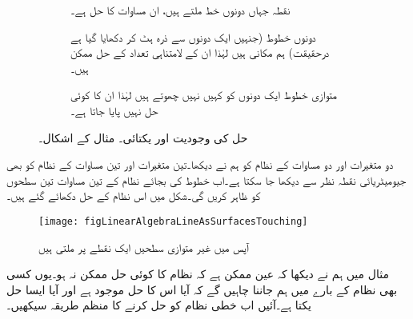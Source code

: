 \begin{figure}
\centering
\begin{subfigure}{0.30\textwidth}
\centering
{}
\caption{ نقطہ  جہاں دونوں خط ملتے ہیں، ان مساوات کا حل ہے۔}
\end{subfigure} \hfill
\begin{subfigure}{0.30\textwidth}
\centering
{}
\caption{ دونوں خطوط (جنہیں ایک دونوں سے ذرہ ہٹ کر دکھایا گیا ہے درحقیقت) ہم مکانی ہیں لہٰذا ان کے لامتناہی تعداد کے حل ممکن ہیں۔}
\end{subfigure}\hfill
\begin{subfigure}{0.30\textwidth}
\centering
{}
\caption{ متوازی خطوط ایک دونوں کو کہیں نہیں چھوتے ہیں لہٰذا ان کا کوئی حل نہیں پایا جاتا ہے۔}
\end{subfigure} \hfill
\caption{حل کی وجودیت اور یکتائی۔ مثال  کے اشکال۔}
\label{شکل_مثال_الجبرا_وجودیت_یکتائی_حل_الف}
\end{figure}
دو متغیرات اور دو مساوات کے نظام کو ہم نے دیکھا۔تین متغیرات اور تین مساوات کے نظام  کو بھی جیومیٹریائی نقطہ نظر سے دیکھا جا سکتا ہے۔اب خطوط کی بجائے نظام کے تین مساوات تین سطحوں کو ظاہر کریں گی۔شکل  میں اس نظام کے حل دکھائے گئے ہیں۔
\begin{figure}
\centering
\texttt{[image: figLinearAlgebraLineAsSurfacesTouching]}
\caption{آپس میں غیر متوازی سطحیں ایک نقطے پر ملتی ہیں}
\label{شکل_خطی_الجبرا_سطح_نقطے_پر_ملتی_ہیں}
\end{figure}
مثال  میں ہم نے دیکھا کہ عین ممکن ہے کہ نظام کا کوئی حل ممکن نہ ہو۔یوں کسی بھی نظام کے بارے میں ہم جاننا چاہیں گے کہ آیا اس کا حل موجود ہے اور آیا ایسا حل یکتا ہے۔آئیں اب خطی نظام کو حل کرنے کا منظم طریقہ سیکھیں۔

